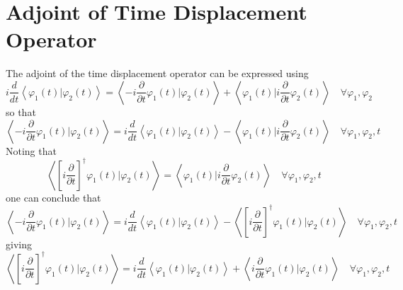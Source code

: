 \documentclass[aps,preprint]{revtex4}
\begin{document}
\appendix

\section{Adjoint of Time Displacement Operator\label{Appendix A}}

The adjoint of the time displacement operator can be expressed using 
\begin{equation}
i\frac{d}{dt}\left\langle \varphi _{1}\left( t\right) |\varphi _{2}\left(
t\right) \right\rangle =\left\langle -i\frac{\partial }{\partial t}\varphi
_{1}\left( t\right) |\varphi _{2}\left( t\right) \right\rangle +\left\langle
\varphi _{1}\left( t\right) |i\frac{\partial }{\partial t}\varphi _{2}\left(
t\right) \right\rangle \quad \forall \varphi _{1},\varphi _{2}
\end{equation}%
so that 
\begin{equation}
\left\langle -i\frac{\partial }{\partial t}\varphi _{1}\left( t\right)
|\varphi _{2}\left( t\right) \right\rangle =i\frac{d}{dt}\left\langle
\varphi _{1}\left( t\right) |\varphi _{2}\left( t\right) \right\rangle
-\left\langle \varphi _{1}\left( t\right) |i\frac{\partial }{\partial t}%
\varphi _{2}\left( t\right) \right\rangle \quad \forall \varphi _{1},\varphi
_{2},t
\end{equation}%
Noting that 
\begin{equation}
\left\langle \left[ i\frac{\partial }{\partial t}\right] ^{\dagger }\varphi
_{1}\left( t\right) |\varphi _{2}\left( t\right) \right\rangle =\left\langle
\varphi _{1}\left( t\right) |i\frac{\partial }{\partial t}\varphi _{2}\left(
t\right) \right\rangle \quad \forall \varphi _{1},\varphi _{2},t
\end{equation}%
one can conclude that 
\begin{equation}
\left\langle -i\frac{\partial }{\partial t}\varphi _{1}\left( t\right)
|\varphi _{2}\left( t\right) \right\rangle =i\frac{d}{dt}\left\langle
\varphi _{1}\left( t\right) |\varphi _{2}\left( t\right) \right\rangle
-\left\langle \left[ i\frac{\partial }{\partial t}\right] ^{\dagger }\varphi
_{1}\left( t\right) |\varphi _{2}\left( t\right) \right\rangle \quad \forall
\varphi _{1},\varphi _{2},t
\end{equation}%
giving 
\begin{equation}
\left\langle \left[ i\frac{\partial }{\partial t}\right] ^{\dagger }\varphi
_{1}\left( t\right) |\varphi _{2}\left( t\right) \right\rangle =i\frac{d}{dt}%
\left\langle \varphi _{1}\left( t\right) |\varphi _{2}\left( t\right)
\right\rangle +\left\langle i\frac{\partial }{\partial t}\varphi _{1}\left(
t\right) |\varphi _{2}\left( t\right) \right\rangle \quad \forall \varphi
_{1},\varphi _{2},t
\end{equation}%
\end{document}

